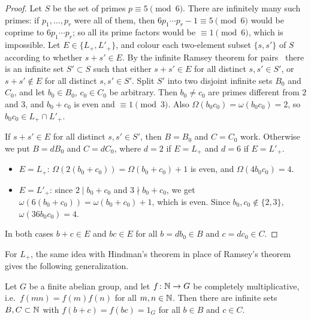 \begin{proof}
Let $S$ be the set of primes $p\equiv5\pmod6$. There are infinitely many such primes: if
$p_1,\dots,p_r$ were all of them, then $6p_1\cdots p_r-1\equiv5\pmod6$ would be coprime
to $6p_1\cdots p_r$; so all its prime factors would be $\equiv1\pmod6$, which is impossible. Let $E\in\{L_+,L'_+\}$, and colour each
two-element subset $\{s,s'\}$ of $S$ according to whether $s+s'\in E$. By the infinite Ramsey
theorem for pairs~\cite{ramsey1930problem} there is an infinite set $S'\subset S$ such that either
$s+s'\in E$ for all distinct $s,s'\in S'$, or $s+s'\notin E$ for all distinct $s,s'\in S'$. Split
$S'$ into two disjoint infinite sets $B_0$ and $C_0$, and let $b_0\in B_0$, $c_0\in C_0$ be arbitrary. Then
$b_0\neq c_0$ are primes different from $2$ and $3$, and $b_0+c_0$ is even and $\equiv1\pmod3$.
Also $\Omega(b_0c_0)=\omega(b_0c_0)=2$, so $b_0c_0\in L_+\cap L'_+$.

If $s+s'\in E$ for all distinct $s,s'\in S'$, then $B=B_0$ and $C=C_0$ work. Otherwise we put
$B=dB_0$ and $C=dC_0$, where $d=2$ if $E=L_+$ and $d=6$ if $E=L'_+$.
\begin{itemize}
\item $E=L_+$: $\Omega(2(b_0+c_0))=\Omega(b_0+c_0)+1$ is even, and
$\Omega(4b_0c_0)=4$.
\item $E=L'_+$: since $2\mid b_0+c_0$ and $3\nmid b_0+c_0$, we get
$\omega(6(b_0+c_0))=\omega(b_0+c_0)+1$, which is even. Since $b_0,c_0\notin\{2,3\}$,
$\omega(36b_0c_0)=4$.
\end{itemize}
In both cases $b+c\in E$ and $bc\in E$ for all $b=db_0\in B$ and $c=dc_0\in C$.
\end{proof}

For $L_+$, the same idea with Hindman's theorem in place of Ramsey's theorem gives the following
generalization.

\begin{proposition}\label{SP:prop:finitegroup}
Let $G$ be a finite abelian group, and let $f\colon\mathbb{N}\to G$ be completely multiplicative, i.e.\
$f(mn)=f(m)f(n)$ for all $m,n\in\mathbb{N}$. Then there are infinite sets $B,C\subset\mathbb{N}$ with
$f(b+c)=f(bc)=1_G$ for all $b\in B$ and $c\in C$.
\end{proposition}

